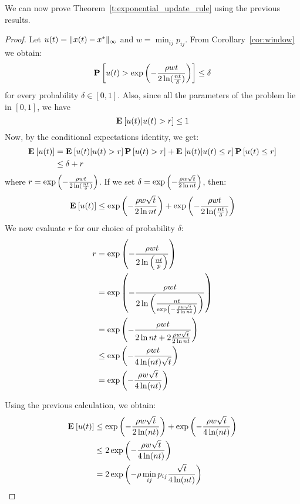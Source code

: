 \noindent We can now prove Theorem~\ref{t:exponential_update_rule} using the previous results.
\begin{proof}
Let $u(t) = \| x(t)-x^* \|_{\infty}$ and $w = \min_{ij}p_{ij}$.
From Corollary~\ref{cor:window} we obtain:
\[ \bm{\mathrm{P}}\left[u(t) >\exp\left(-\frac{\rho wt}{2\ln( \frac{nt}{\delta})} \right)\right] \leq \delta \]
for every probability $\delta \in [0,1]$. Also, since all the
parameters of the problem lie in $[0,1]$, we have
\[\Exp{u(t)|u(t) > r} \leq 1\]
Now, by the conditional expectations identity, we get:
\begin{align*}
\Exp{u(t)} &= \Exp{u(t)|u(t) > r}\Prob{u(t) > r} +\Exp{u(t)|u(t) \leq r}\Prob{u(t) \leq r}\\
&\leq \delta + r
\end{align*}
where $r = \exp \left(-\frac{\rho wt}{2\ln( \frac{nt}{\delta})}\right)$.
If we set $\delta = \exp \left(-\frac{\rho w\sqrt{t}}{2\ln nt}\right)$, then:
\[
\Exp{u(t)} \leq \exp \lp(-\frac{\rho w\sqrt{t}}{2\ln nt}\rp)
+ \exp \lp(-\frac{\rho wt}{2\ln( \frac{nt}{\delta})}\rp)
\]
We now evaluate $r$ for our choice of probability $\delta$:
\begin{align*}
r
&= \exp \left(-\frac{\rho wt}{2\ln\left( \frac{nt}{p}\right)} \right)\\
&= \exp \left(-\frac{\rho wt}{2\ln\left( \frac{nt}{\exp \left(-\frac{\rho w\sqrt{t}}{2\ln nt}\right) }\right) } \right) \\
&= \exp \left(-\frac{\rho wt}{2\ln nt + 2\frac{\rho w\sqrt{t}}{2\ln nt} }\right)\\
&\leq \exp \left(-\frac{\rho w t}{4\ln(nt) \sqrt{t}}\right)\\
&= \exp \left(-\frac{\rho w\sqrt{t}}{4\ln(nt)}\right)
\end{align*}

Using the previous calculation, we obtain:
\begin{align*}
\Exp{u(t)} &\leq \exp \lp(-\frac{\rho w\sqrt{t}}{2\ln (nt)}\rp) +
\exp \lp(-\frac{\rho w\sqrt{t}}{4\ln(nt)}\rp) \\
&\leq 2\exp \lp(-\frac{\rho w\sqrt{t}}{4\ln(nt)}\rp)\\
&=2\exp \lp(- \rho  \min_{ij} p_{ij} \frac{\sqrt{t}}{4\ln(nt)} \rp)
\end{align*}
\end{proof}


